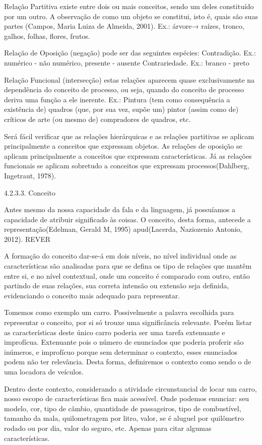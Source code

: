 Relação Partitiva existe entre dois ou mais conceitos, sendo um deles constituído por um outro. A observação de como um objeto se constitui, isto é, quais são suas partes (Campos, Maria Luiza de Almeida, 2001).
Ex.: árvore→ raízes, tronco, galhos, folhas, flores, frutos.

Relação de Oposição (negação) pode ser das seguintes espécies:
Contradição. Ex.: numérico - não numérico, presente - ausente
Contrariedade. Ex.: branco - preto

Relação Funcional (intersecção) estas relações aparecem quase exclusivamente na dependência do conceito de processo, ou seja, quando do conceito de processo deriva uma função a ele inerente. Ex.: Pintura (tem como consequência a existência de) quadros (que, por sua vez, supõe um) pintor (assim como de) críticos de arte (ou mesmo de) compradores de quadros, etc.

Será fácil verificar que as relações hierárquicas e as relações partitivas se aplicam principalmente a conceitos que expressam objetos. As relações de oposição se aplicam principalmente a conceitos que expressam características. Já as relações funcionais se aplicam sobretudo a conceitos que expressam processos(Dahlberg, Ingetraut, 1978).

4.2.3.3. Conceito

Antes mesmo da nossa capacidade da fala e da linguagem, já possuíamos a capacidade de atribuir significado às coisas. O conceito, desta forma, antecede a representação(Edelman, Gerald M, 1995) apud(Lacerda, Naziozenio Antonio, 2012). REVER

A formação do conceito dar-se-á em dois níveis, no nível individual onde as características são analisadas para que se defina os tipo de relações que mantêm entre si, e no nível contextual, onde um conceito é comparado com outro, então partindo de suas relações, sua correta intensão ou extensão seja definida, evidenciando o conceito mais adequado para representar.

Tomemos como exemplo um carro. Possivelmente a palavra escolhida para representar o conceito, por si só trouxe uma significância relevante. Porém listar as características deste único carro poderia ser uma tarefa extenuante e improfícua. Extenuante pois o número de enunciados que poderia proferir são inúmeros, e improfícuo porque sem determinar o contexto, esses enunciados podem não ter relevância. Desta forma, definiremos o contexto como sendo o de uma locadora de veículos.

Dentro deste contexto, considerando a atividade circunstancial de locar um carro, nosso escopo de características fica mais acessível. Onde podemos enunciar: seu modelo, cor, tipo de câmbio, quantidade de passageiros, tipo de combustível, tamanho da mala, quilometragem por litro, valor, se é aluguel por quilômetro rodado ou por dia, valor do seguro, etc. Apenas para citar algumas características.

